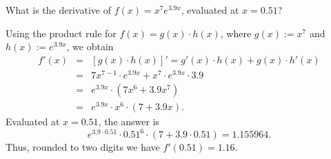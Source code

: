 
\begin{question}
What is the derivative of $f(x) = x^{7} e^{3.9x}$, evaluated at $x = 0.51$?
\end{question}

\begin{solution}
Using the product rule for $f(x) = g(x) \cdot h(x)$, where $g(x) := x^{7}$ and $h(x) := e^{3.9x}$, we obtain
\begin{eqnarray*}
f'(x) & = & [g(x) \cdot h(x)]' = g'(x) \cdot h(x) + g(x) \cdot h'(x) \\
      & = & 7 x^{7 - 1} \cdot e^{3.9x} + x^{7} \cdot e^{3.9x} \cdot 3.9 \\
      & = & e^{3.9x} \cdot(7 x^6 + 3.9 x^{7}) \\
      & = & e^{3.9x} \cdot x^6 \cdot (7 + 3.9x).
\end{eqnarray*}
Evaluated at $x = 0.51$, the answer is
\[ e^{3.9\cdot 0.51} \cdot 0.51^6 \cdot (7 + 3.9\cdot 0.51) = 1.155964. \]
Thus, rounded to two digits we have $f'(0.51) = 1.16$.
\end{solution}

